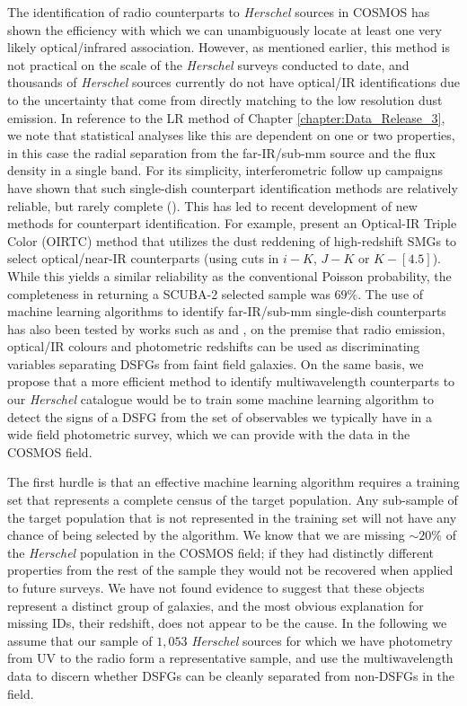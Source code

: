 The identification of radio counterparts to \textit{Herschel} sources in COSMOS has shown the efficiency with which we can unambiguously locate at least one very likely optical/infrared association. However, as mentioned earlier, this method is not practical on the scale of the \textit{Herschel} surveys conducted to date, and thousands of \textit{Herschel} sources currently do not have optical/IR identifications due to the uncertainty that come from directly matching to the low resolution dust emission. In reference to the LR method of Chapter \ref{chapter:Data_Release_3}, we note that statistical analyses like this are dependent on one or two properties, in this case the radial separation from the far-IR/sub-mm source and the flux density in a single band. For its simplicity, interferometric follow up campaigns have shown that such single-dish counterpart identification methods are relatively reliable, but rarely complete (\citealt{Hodge_2013, Koprowski_2014}). This has led to recent development of new methods for counterpart identification. For example, \citealt{Chen_2016b} present an Optical-IR Triple Color (OIRTC) method that utilizes the dust reddening of high-redshift SMGs to select optical/near-IR counterparts (using cuts in $i - K$, $J - K$ or $K - [4.5]$). While this yields a similar reliability as the conventional Poisson probability, the completeness in returning a SCUBA-2 selected sample was $69\%$. The use of machine learning algorithms to identify far-IR/sub-mm single-dish counterparts has also been tested by works such as \citealt{An_2018} and \citealt{Liu_2019}, on the premise that radio emission, optical/IR colours and photometric redshifts can be used as discriminating variables separating DSFGs from faint field galaxies. On the same basis, we propose that a more efficient method to identify multiwavelength counterparts to our \textit{Herschel} catalogue would be to train some machine learning algorithm to detect the signs of a DSFG from the set of observables we typically have in a wide field photometric survey, which we can provide with the data in the COSMOS field.

The first hurdle is that an effective machine learning algorithm requires a training set that represents a complete census of the target population. Any sub-sample of the target population that is not represented in the training set will not have any chance of being selected by the algorithm. We know that we are missing $\sim 20\%$ of the \textit{Herschel} population in the COSMOS field; if they had distinctly different properties from the rest of the sample they would not be recovered when applied to future surveys. We have not found evidence to suggest that these objects represent a distinct group of galaxies, and the most obvious explanation for missing IDs, their redshift, does not appear to be the cause. In the following we assume that our sample of $1,053$ \textit{Herschel} sources for which we have photometry from UV to the radio form a representative sample, and use the multiwavelength data to discern whether DSFGs can be cleanly separated from non-DSFGs in the field.

